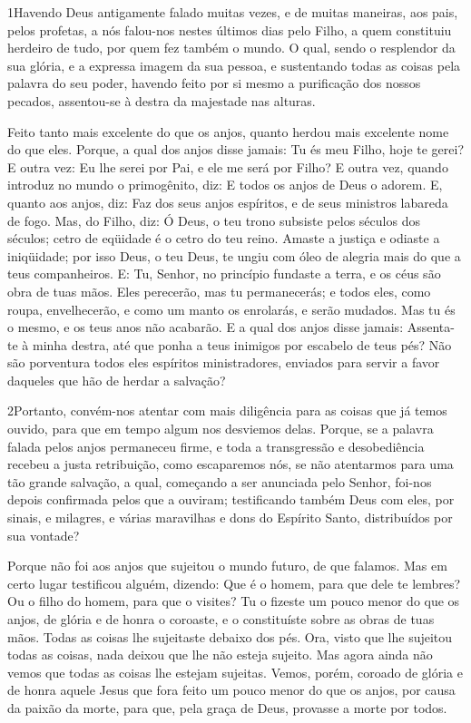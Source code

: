 
\lettrine{1} Havendo Deus antigamente falado muitas vezes, e
de muitas maneiras, aos pais, pelos profetas, a nós falou-nos nestes
últimos dias pelo Filho, a quem constituiu herdeiro de tudo, por
quem fez também o mundo. O qual, sendo o resplendor da sua
glória, e a expressa imagem da sua pessoa, e sustentando todas as
coisas pela palavra do seu poder, havendo feito por si mesmo a
purificação dos nossos pecados, assentou-se à destra da majestade
nas alturas.

Feito tanto mais excelente do que os anjos, quanto herdou mais
excelente nome do que eles. Porque, a qual dos anjos disse
jamais: Tu és meu Filho, hoje te gerei? E outra vez: Eu lhe serei
por Pai, e ele me será por Filho? E outra vez, quando introduz
no mundo o primogênito, diz: E todos os anjos de Deus o adorem.
E, quanto aos anjos, diz: Faz dos seus anjos espíritos, e de
seus ministros labareda de fogo. Mas, do Filho, diz: Ó Deus, o
teu trono subsiste pelos séculos dos séculos; cetro de eqüidade é o
cetro do teu reino. Amaste a justiça e odiaste a iniqüidade; por
isso Deus, o teu Deus, te ungiu com óleo de alegria mais do que a
teus companheiros. E: Tu, Senhor, no princípio fundaste a
terra, e os céus são obra de tuas mãos. Eles perecerão, mas
tu permanecerás; e todos eles, como roupa, envelhecerão, e
como um manto os enrolarás, e serão mudados. Mas tu és o mesmo, e os
teus anos não acabarão. E a qual dos anjos disse jamais:
Assenta-te à minha destra, até que ponha a teus inimigos por
escabelo de teus pés? Não são porventura todos eles espíritos
ministradores, enviados para servir a favor daqueles que hão de
herdar a salvação?

\medskip

\lettrine{2} Portanto, convém-nos atentar com mais diligência
para as coisas que já temos ouvido, para que em tempo algum nos
desviemos delas. Porque, se a palavra falada pelos anjos
permaneceu firme, e toda a transgressão e desobediência recebeu a
justa retribuição, como escaparemos nós, se não atentarmos para
uma tão grande salvação, a qual, começando a ser anunciada pelo
Senhor, foi-nos depois confirmada pelos que a ouviram;
testificando também Deus com eles, por sinais, e milagres, e
várias maravilhas e dons do Espírito Santo, distribuídos por sua
vontade?

Porque não foi aos anjos que sujeitou o mundo futuro, de que
falamos. Mas em certo lugar testificou alguém, dizendo: Que é o
homem, para que dele te lembres? Ou o filho do homem, para que o
visites? Tu o fizeste um pouco menor do que os anjos, de glória
e de honra o coroaste, e o constituíste sobre as obras de tuas mãos.
Todas as coisas lhe sujeitaste debaixo dos pés. Ora, visto que
lhe sujeitou todas as coisas, nada deixou que lhe não esteja
sujeito. Mas agora ainda não vemos que todas as coisas lhe estejam
sujeitas. Vemos, porém, coroado de glória e de honra aquele
Jesus que fora feito um pouco menor do que os anjos, por causa da
paixão da morte, para que, pela graça de Deus, provasse a morte por
todos.

